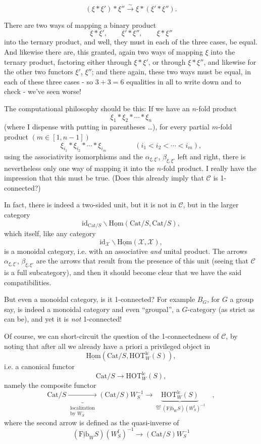 \documentclass[11pt]{article}
\newcommand{\printedpage}[1]{\marginpar{\footnotesize p.~#1}}
\newcommand{\msp}[1]{\marginpar{\footnotesize [#1]}}
\newcommand{\Hom}{\underline{\mathrm{Hom}}}
\newcommand{\Fib}{\underline{\mathrm{Fib}}}
\newcommand{\Cat}{\mathrm{Cat}}
\newcommand{\HOT}{\mathrm{HOT}}
\newcommand{\id}{\mathrm{id}}
\begin{document}
\msp{page 202}
\[
(\xi * \xi') * \xi'' \xrightarrow{\sim} \xi * (\xi' * \xi'').
\]

There are two ways of mapping a binary product
\[
\xi * \xi', \qquad \xi' * \xi'', \qquad \xi * \xi''
\]
into the ternary product, and well, they must in each of the three cases, be equal. And likewise there are, this granted, again two ways of mapping $\xi$ into the ternary product, factoring either through $\xi * \xi'$, or through $\xi * \xi''$, and likewise for the other two functors $\xi'$, $\xi''$; and there again, these two ways must be equal, in each of these three cases - so $3 + 3 = 6$ equalities in all to write down and to check - we've seen worse!

The computational philosophy should be this: If we have an $n$-fold product
\[
\xi_1 * \xi_2 * \cdots * \xi_n
\]
(where I dispense with putting in parentheses \dots), for every partial $m$-fold product $(m \in [1, n-1])$\msp{page 203}
\[
\xi_{i_1} * \xi_{i_2} * \cdots * \xi_{i_m} \qquad\qquad (i_1 < i_2 < \cdots < i_m),
\]
using the associativity isomorphisms and the $\alpha_{\xi,\xi'}$, $\beta_{\xi,\xi'}$ left and right, there is nevertheless only one way of mapping it into the $n$-fold product. I really have the impression that this must be true. (Does this already imply that $\mathcal{C}$ is 1-connected?)

In fact, there is indeed a two-sided unit, but it is not in $\mathcal{C}$, but in the larger category
\[
\id_{\Cat/S}\backslash\Hom(\Cat/S, \Cat/S),
\]
which itself, like any category
\[
\id_{\mathcal{X}}\backslash\Hom(\mathcal{X}, \mathcal{X}),
\]
\printedpage{133}
is a monoidal category, i.e. with an associative \textit{and} unital product. The arrows $\alpha_{\xi,\xi'}$, $\beta_{\xi,\xi'}$ are the arrows that result from the presence of this unit (seeing that $\mathcal{C}$ is a full subcategory), and then it should become clear that we have the said compatibilities.

\msp{page 204}But even a monoidal category, is it 1-connected? For example $B_G$, for $G$ a group say, is indeed a monoidal category and even ``groupal'', a $G$-category (as strict as can be), and yet it is \textit{not} 1-connected!

Of course, we can short-circuit the question of the 1-connectedness of $\mathcal{C}$, by noting that after all we already have a priori a privileged object in
\[
\Hom(\Cat/S, \HOT^{\mathrm{lc}}_W(S)),
\]
i.e. a canonical functor
\[
\Cat/S \longrightarrow \HOT^{\mathrm{lc}}_W(S),
\]
namely the composite functor
\[
\Cat/S \underbrace{\longrightarrow}_{\substack{\text{localization}\\ \text{by } W_S}} (\Cat/S)W_S^{-1} \longrightarrow \underbrace{\HOT^{\mathrm{lc}}_W(S)}_{\overset{\text{def}}{=} (\Fib_W S)(W^{\mathrm{f}}_S)^{-1}} \quad ,
\tag*{$(*)$}
\]
where the second arrow is defined as the quasi-inverse of
\[
(\Fib_W S)(W^{\mathrm{f}}_S)^{-1} \longrightarrow (\Cat/S)W_S^{-1}
\tag*{$(**)$}
\]
\end{document}
